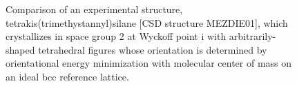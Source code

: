 \documentclass[preprint]{revtex4}
\begin{document}
\pagebreak

\begin{figure}[!ht]
\caption{Comparison of an experimental structure,
tetrakis(trimethystannyl)silane  [CSD structure MEZDIE01], which
crystallizes in space group 2 at Wyckoff point i with
arbitrarily-shaped tetrahedral figures whose orientation is
determined by orientational energy minimization with molecular
center of mass on an ideal bcc reference lattice.\label{compare}}
\end{figure}
\end{document}
